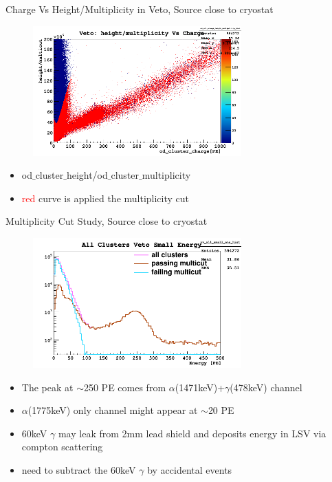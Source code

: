 \documentclass[9pt]{beamer}
\begin{document}
\begin{frame}{Charge Vs Height/Multiplicity in Veto, Source close to cryostat}
\begin{figure}
\includegraphics[height= 5cm, width=.8\textwidth]{nv_charge_height_multiplicity_Feb7PM.png}
\end{figure}
\begin{itemize}
[bullet]
\item od$\_$cluster$\_$height/od$\_$cluster$\_$multiplicity
\item \textcolor{red}{red} curve is applied the multiplicity cut
\end{itemize}
\end{frame}

\begin{frame}{Multiplicity Cut Study, Source close to cryostat}
\begin{figure}
\includegraphics[height= 5cm, width=.8\textwidth]{multicut_Feb7PM.png}
\end{figure}
\begin{itemize}
[bullet]
\item The peak at $\sim$250 PE comes from $\alpha$(1471keV)+$\gamma$(478keV) channel
\item $\alpha$(1775keV) only channel might appear at $\sim$20 PE 
\item 60keV $\gamma$ may leak from 2mm lead shield and deposits energy in LSV via compton scattering
\item need to subtract the 60keV $\gamma$ by accidental events 
\end{itemize}
\end{frame}
\end{document}
